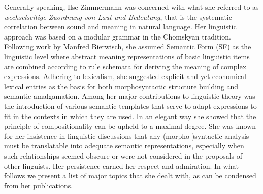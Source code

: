 \documentclass[output=paper,colorlinks,citecolor=brown]{langscibook}
\begin{document}
\newpage
Generally speaking, Ilse Zimmermann was concerned with what she referred to as \textit{wechselseitige Zuordnung von Laut und Bedeutung}, that is the systematic correlation between sound and meaning in natural language. Her linguistic approach was based on a modular grammar in the Chomskyan tradition. Following work by Manfred Bierwisch, she assumed Semantic Form (SF) as the linguistic level where abstract meaning representations of basic linguistic items are combined according to rule schemata for deriving the meaning of complex expressions. Adhering to lexicalism, she suggested explicit and yet economical lexical entries as the basis for both morphosyntactic structure building and semantic amalgamation. Among her major contributions to linguistic theory was the introduction of various semantic templates that serve to adapt expressions to fit in the contexts in which they are used. In an elegant way she showed that the principle of compositionality can be upheld to a maximal degree. She was known for her insistence in linguistic discussions that any (morpho-)syntactic analysis must be translatable into adequate semantic representations, especially when such relationships seemed obscure or were not considered in the proposals of other linguists. Her persistence earned her respect and admiration. In what follows we present a list of major topics that she dealt with, as can be condensed from her publications.
\end{document}

